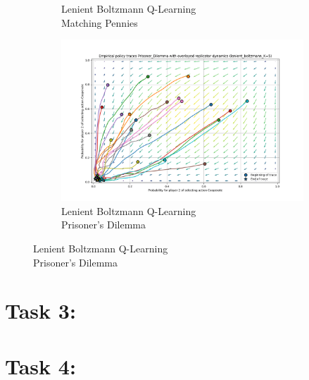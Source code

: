 \documentclass[12pt,letterpaper, onecolumn]{exam}
\begin{document}
\begin{figure}
\begin{subfigure}{.5\textwidth}
      \caption{Lenient Boltzmann Q-Learning\\ Matching Pennies}
      \label{fig:sfiglbmp}
    \end{subfigure}%
    \begin{subfigure}{.5\textwidth}
      \centering
      \includegraphics[width=.6\linewidth]{plots/replicator_trajectoreis_Prisoner_Dilemma_lenient_boltzmann_K=5.png}
      \caption{Lenient Boltzmann Q-Learning\\ Prisoner's Dilemma}
      \label{fig:sfiglbpd}
    \end{subfigure}%
\end{figure}
\subsection{}

\section{\textbf{Task 3:}}

\section{\textbf{Task 4:}}
\end{document}
